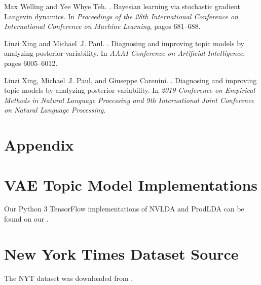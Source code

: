 \documentclass[10pt]{article}
\begin{document}
\begin{thebibliography}{}
Max Welling and Yee Whye Teh.
.
\newblock Bayesian learning via stochastic gradient Langevin dynamics.
\newblock In {\em Proceedings of the 28th International Conference on International Conference on Machine Learning}, pages 681–688.

Linzi Xing and Michael~J. Paul.
.
\newblock Diagnosing and improving topic models by analyzing posterior variability.
\newblock In {\em AAAI Conference on Artificial Intelligence}, pages 6005–6012.

Linzi Xing, Michael~J. Paul, and Giuseppe Carenini.
.
\newblock Diagnosing and improving topic models by analyzing posterior variability.
\newblock In {\em 2019 Conference on Empirical Methods in Natural Language Processing and 9th International Joint Conference on Natural Language Processing}.

\end{thebibliography}

\appendix

\section*{Appendix}

\section{VAE Topic Model Implementations}\label{sec:code}

Our Python 3 TensorFlow implementations of NVLDA and ProdLDA can be found on our \href{https://github.com/chiukenny/CPSC503-finalproject}{\color{blue}{GitHub}}.

\section{New York Times Dataset Source}\label{sec:datasource}

The NYT dataset was downloaded from \href{https://www.kaggle.com/nzalake52/new-york-times-articles}{\color{blue}{Kaggle}}.
\end{document}
